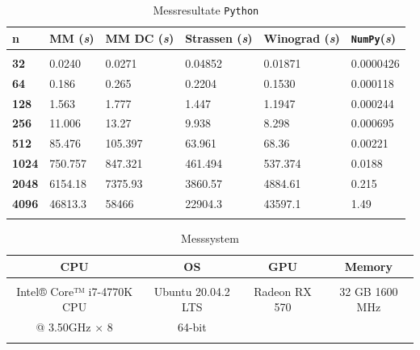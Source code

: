 	 \begin{table}
	 			 \begin{center}
	 					 \begin{tabular}{l l l l l l}
	 							 \hline
	 							 \hline
	 							 \textbf{n} & \textbf{MM (\textit{s})} &  \textbf{MM DC (\textit{s})} & \textbf{Strassen (\textit{s})}  & \textbf{Winograd (\textit{s})} & \textbf{\texttt{NumPy}(\textit{s})} \\
	 							 \hline
	 							 \multicolumn{6}{c}{} \\
	 							 \textbf{32}   & 0.0240 &0.0271 &  0.04852& 0.01871 & 0.0000426  \\
	 							 \textbf{64}   & 0.186  & 0.265&  0.2204& 0.1530& 0.000118 \\
	 							 \textbf{128}  & 1.563   & 1.777&  1.447&  1.1947 & 0.000244 \\
	 							 \textbf{256}  & 11.006    & 13.27 & 9.938 &  8.298& 0.000695 \\
	 							 \textbf{512}  & 85.476    & 105.397 & 63.961 & 68.36 &  0.00221\\
	 							 \textbf{1024} & 750.757     & 847.321& 461.494  & 537.374 & 0.0188 \\
								 \textbf{2048} & 6154.18     & 7375.93& 3860.57  & 4884.61 & 0.215 \\
								 \textbf{4096} & 46813.3     & 58466 & 22904.3  & 43597.1 & 1.49 \\
	 							 \multicolumn{6}{c}{} \\
	 							 \hline
	 							 \hline
	 					 \end{tabular}
	 			 \end{center}
	 			 \caption{Messresultate \texttt{Python}}
	 			 \label{multiplikation:tab:messung_Python}
	 	 \end{table}

		 \begin{table}
		 			 \begin{center}
		 					 \begin{tabular}{c c c c}
		 							 \hline
		 							 \hline
		 							 \textbf{CPU} & \textbf{OS} &  \textbf{GPU } & \textbf{Memory }  \\
		 							 \hline
		 							 \multicolumn{4}{c}{} \\
		 							   Intel® Core™ i7-4770K CPU  & Ubuntu 20.04.2 LTS & Radeon RX 570 &  32 GB 1600 MHz   \\
										 @ 3.50GHz × 8  & 64-bit & &    \\
		 							 \multicolumn{4}{c}{} \\
		 							 \hline
		 							 \hline
		 					 \end{tabular}
		 			 \end{center}
		 			 \caption{Messsystem}
		 			 \label{multiplikation:tab:pc_config}
		 	 \end{table}

